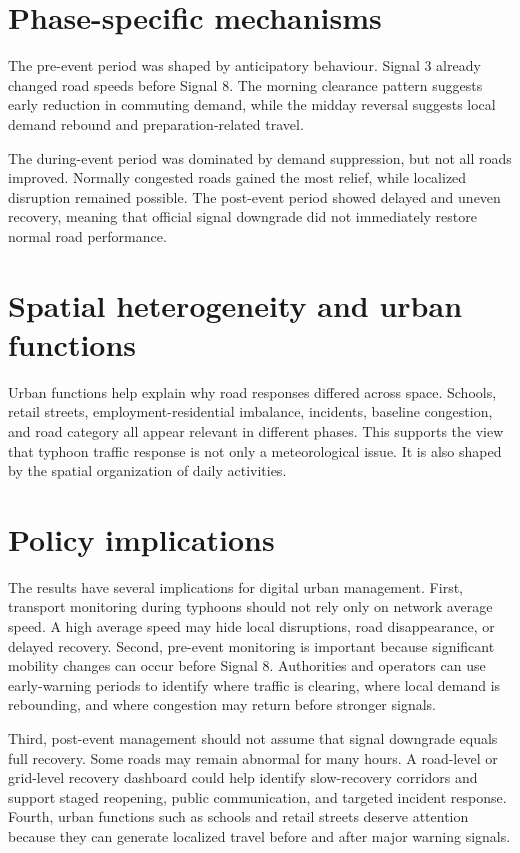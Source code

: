\documentclass[12pt,a4paper]{report}
\begin{document}
\section{Phase-specific mechanisms}
The pre-event period was shaped by anticipatory behaviour. Signal 3 already changed road speeds before Signal 8. The morning clearance pattern suggests early reduction in commuting demand, while the midday reversal suggests local demand rebound and preparation-related travel.

The during-event period was dominated by demand suppression, but not all roads improved. Normally congested roads gained the most relief, while localized disruption remained possible. The post-event period showed delayed and uneven recovery, meaning that official signal downgrade did not immediately restore normal road performance.

\section{Spatial heterogeneity and urban functions}
Urban functions help explain why road responses differed across space. Schools, retail streets, employment-residential imbalance, incidents, baseline congestion, and road category all appear relevant in different phases. This supports the view that typhoon traffic response is not only a meteorological issue. It is also shaped by the spatial organization of daily activities.

\section{Policy implications}
The results have several implications for digital urban management. First, transport monitoring during typhoons should not rely only on network average speed. A high average speed may hide local disruptions, road disappearance, or delayed recovery. Second, pre-event monitoring is important because significant mobility changes can occur before Signal 8. Authorities and operators can use early-warning periods to identify where traffic is clearing, where local demand is rebounding, and where congestion may return before stronger signals.

Third, post-event management should not assume that signal downgrade equals full recovery. Some roads may remain abnormal for many hours. A road-level or grid-level recovery dashboard could help identify slow-recovery corridors and support staged reopening, public communication, and targeted incident response. Fourth, urban functions such as schools and retail streets deserve attention because they can generate localized travel before and after major warning signals.
\end{document}
